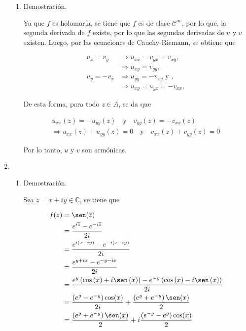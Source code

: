 \documentclass[12pt, fleqn]{article}
\newcommand{\complejos}{\mathbb{C}}
\newcommand{\cis}[2]{\cos \left( #1 \right) #2 i \sen \left( #1 \right)}
\newcommand{\clase}[1]{$ \mathcal{C}^#1 $}
\begin{document}
\begin{enumerate}
\begin{enumerate}
			\item Demostración.
			
			Ya que $ f $ es holomorfa, se tiene que $f$ es de clase \clase{\infty}, por lo que, la segunda derivada de $f$ existe, por lo que las segundas derivadas de $u$ y $v$ existen. Luego, por las ecuaciones de Cauchy-Riemann, se obtiene que

			\begin{align*}
				u_x = v_y & \Longrightarrow u_{xx} = v_{yx} = v_{xy}, \\
				& \Longrightarrow u_{xy} = v_{yy}, \\
				u_y = -v_x & \Longrightarrow u_{yy} = -v_{xy} \mbox{ y }, \\
				& \Longrightarrow u_{xy} = u_{yx} = -v_{xx},
			\end{align*}

			De esta forma, para todo $ z \in A $, se da que

			\begin{align*}
				u_{xx} (z) = -u_{yy} (z) \quad \mbox{y} \quad v_{yy} (z) = -v_{xx} (z) \\
				\Longrightarrow u_{xx} (z) + u_{yy} (z) = 0 \quad \mbox{y} \quad v_{xx} (z) + v_{yy} (z) = 0
			\end{align*}
			
			Por lo tanto, $u$ y $v$ son armónicas.
		\end{enumerate}
		\item \begin{enumerate}
			\item Demostración.
			
			Sea $ z = x + iy \in \complejos $, se tiene que

			\begin{align*}
				f(z) &= \sen (\overline{z}) \\
				&= \dfrac{e^{i\overline{z}} - e^{-i\overline{z}}}{2i} \\
				&= \dfrac{e^{i(x - iy)} - e^{-i(x - iy)}}{2i} \\
				&= \dfrac{e^{y + ix} - e^{-y - ix}}{2i} \\
				&= \dfrac{e^{y} \left( \cis{x}{+} \right) - e^{-y} \left( \cis{x}{-} \right)}{2i} \\
				&= \dfrac{\left( e^{y} - e^{-y} \right) \cos(x)}{2i} + \dfrac{\left( e^{y} + e^{-y} \right) \sen(x)}{2}\\
				&= \dfrac{\left( e^{y} + e^{-y} \right) \sen(x)}{2} + i \dfrac{\left( e^{-y} - e^{y} \right) \cos(x)}{2} \\
			\end{align*}


\end{enumerate}
\end{enumerate}
\end{document}
